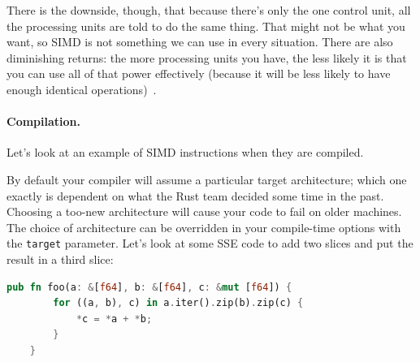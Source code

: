 There is the downside, though, that because there's only the one control unit, all the processing units are told to do the same thing. That might not be what you want, so SIMD is not something we can use in every situation. There are also diminishing returns: the more processing units you have, the less likely it is that you can use all of that power effectively (because it will be less likely to have enough identical operations)~\cite{sse}.

\paragraph{Compilation.} Let's look at an example of SIMD instructions when they are compiled.

By default your compiler will assume a particular target architecture; which one exactly is dependent on what the Rust team decided some time in the past. Choosing a too-new architecture will cause your code to fail on older machines. The choice of architecture can be overridden in your compile-time options with the \texttt{target} parameter. Let's look at some SSE code to add two slices and put the result in a third slice:

\begin{lstlisting}[language=Rust]
    pub fn foo(a: &[f64], b: &[f64], c: &mut [f64]) {
        for ((a, b), c) in a.iter().zip(b).zip(c) {
            *c = *a + *b;
        }
    }\end{lstlisting}


